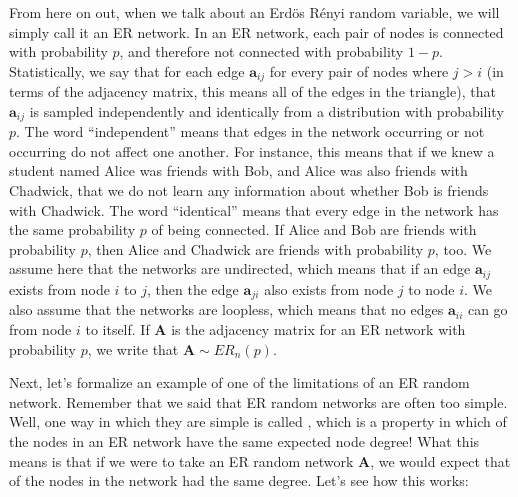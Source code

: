 \documentclass[letterpaper,10pt,english]{jupyterBook}
\begin{document}
\sphinxAtStartPar
From here on out, when we talk about an Erdös Rényi random variable, we will simply call it an ER network. In an ER network, each pair of nodes is connected with probability \(p\), and therefore not connected with probability \(1-p\). Statistically, we say that for each edge \(\mathbf{a}_{ij}\) for every pair of nodes where \(j > i\) (in terms of the adjacency matrix, this means all of the edges in the  triangle), that \(\mathbf{a}_{ij}\) is sampled independently and identically from a  distribution with probability \(p\). The word “independent” means that edges in the network occurring or not occurring do not affect one another. For instance, this means that if we knew a student named Alice was friends with Bob, and Alice was also friends with Chadwick, that we do not learn any information about whether Bob is friends with Chadwick. The word “identical” means that every edge in the network has the same probability \(p\) of being connected. If Alice and Bob are friends with probability \(p\), then Alice and Chadwick are friends with probability \(p\), too. We assume here that the networks are undirected, which means that if an edge \(\mathbf a_{ij}\) exists from node \(i\) to \(j\), then the edge \(\mathbf a_{ji}\) also exists from node \(j\) to node \(i\). We also assume that the networks are loopless, which means that no edges \(\mathbf a_{ii}\) can go from node \(i\) to itself. If \(\mathbf A\) is the adjacency matrix for an ER network with probability \(p\), we write that \(\mathbf A \sim ER_n(p)\).

\sphinxAtStartPar
Next, let’s formalize an example of one of the limitations of an ER random network. Remember that we said that ER random networks are often too simple. Well, one way in which they are simple is called , which is a property in which  of the nodes in an ER network have the  same expected node degree! What this means is that if we were to take an ER random network \(\mathbf A\), we would expect that  of the nodes in the network had the same degree. Let’s see how this works:
\end{document}

